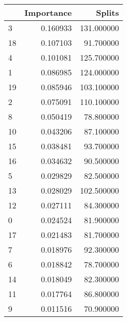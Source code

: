 \begin{tabular}{lrr}
\toprule
 & Importance & Splits \\
\midrule
3 & 0.160933 & 131.000000 \\
18 & 0.107103 & 91.700000 \\
4 & 0.101081 & 125.700000 \\
1 & 0.086985 & 124.000000 \\
19 & 0.085946 & 103.100000 \\
2 & 0.075091 & 110.100000 \\
8 & 0.050419 & 78.800000 \\
10 & 0.043206 & 87.100000 \\
15 & 0.038481 & 93.700000 \\
16 & 0.034632 & 90.500000 \\
5 & 0.029829 & 82.500000 \\
13 & 0.028029 & 102.500000 \\
12 & 0.027111 & 84.300000 \\
0 & 0.024524 & 81.900000 \\
17 & 0.021483 & 81.700000 \\
7 & 0.018976 & 92.300000 \\
6 & 0.018842 & 78.700000 \\
14 & 0.018049 & 82.300000 \\
11 & 0.017764 & 86.800000 \\
9 & 0.011516 & 70.900000 \\
\bottomrule
\end{tabular}